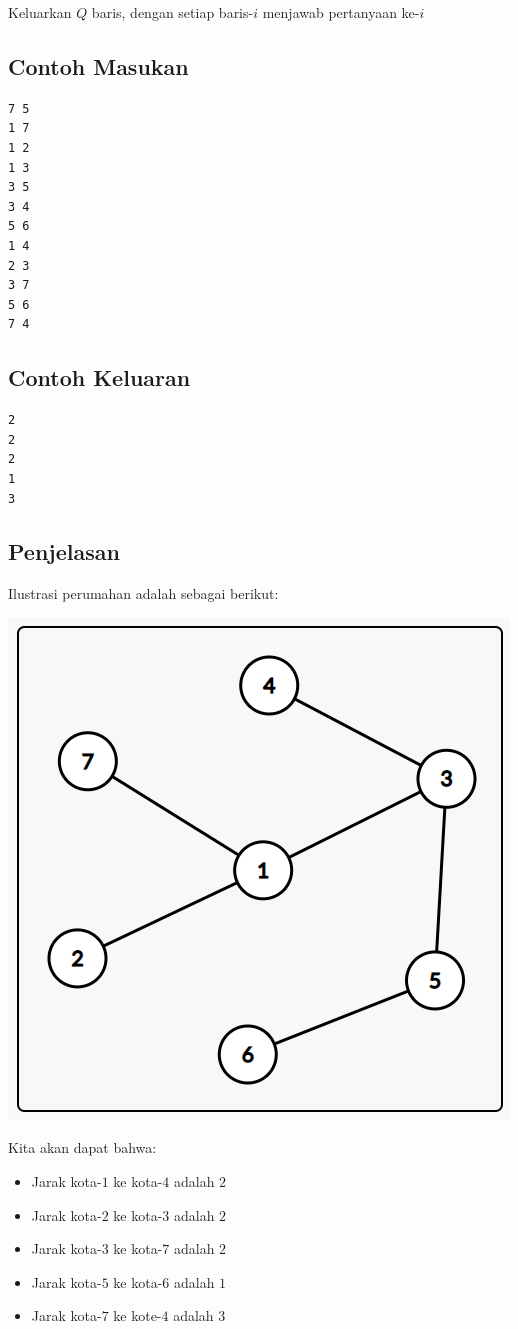 \documentclass{article}
\begin{document}
Keluarkan $Q$ baris, dengan setiap baris-$i$ menjawab pertanyaan ke-$i$

\begin{multicols}{2}
\subsection*{Contoh Masukan}
\begin{lstlisting}
7 5
1 7
1 2
1 3
3 5
3 4
5 6
1 4
2 3
3 7
5 6
7 4

\end{lstlisting}
\columnbreak
\subsection*{Contoh Keluaran}
\begin{lstlisting}
2
2
2
1
3
\end{lstlisting}
\vfill
\null
\end{multicols}
\pagebreak
\subsection*{Penjelasan}
Ilustrasi perumahan adalah sebagai berikut:
\begin{center}
\includegraphics[scale=0.6]{graf}
\end{center}
Kita akan dapat bahwa:
\begin{itemize}
	\item Jarak kota-$1$ ke kota-$4$ adalah $2$
	\item Jarak kota-$2$ ke kota-$3$ adalah $2$
	\item Jarak kota-$3$ ke kota-$7$ adalah $2$
	\item Jarak kota-$5$ ke kota-$6$ adalah $1$
	\item Jarak kota-$7$ ke kote-$4$ adalah $3$
\end{itemize}


\pagebreak
\end{document}
